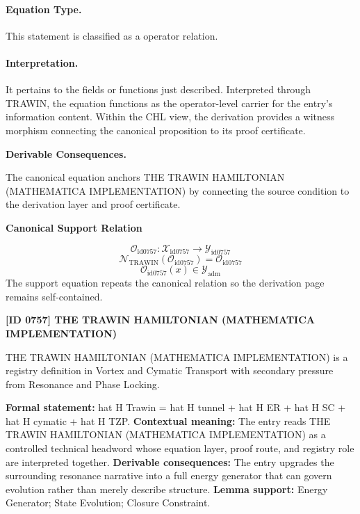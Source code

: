 \paragraph{Equation Type.}
This statement is classified as a operator relation.

\paragraph{Interpretation.}
It pertains to the fields or functions just described. Interpreted through TRAWIN, the equation functions as the operator-level carrier for the entry’s information content. Within the CHL view, the derivation provides a witness morphism connecting the canonical proposition to its proof certificate.

\par\vspace{0.35em}
\noindent\textbf{Derivable Consequences.}\quad
\begingroup
\footnotesize
\raggedright
The canonical equation anchors THE TRAWIN HAMILTONIAN (MATHEMATICA IMPLEMENTATION) by connecting the source condition to the derivation layer and proof certificate.
\par\endgroup

\noindent\textbf{Canonical Support Relation}\par
\[
\mathcal{O}_{\mathrm{id0757}}:\mathcal{X}_{\mathrm{id0757}}\longrightarrow\mathcal{Y}_{\mathrm{id0757}}
\]
\[
\mathcal{N}_{\mathrm{TRAWIN}}(\mathcal{O}_{\mathrm{id0757}})=\mathcal{O}_{\mathrm{id0757}}
\]
\[
\mathcal{O}_{\mathrm{id0757}}(x)\in\mathcal{Y}_{\mathrm{adm}}
\]
\noindent The support equation repeats the canonical relation so the derivation page remains self-contained.\par

\clearpage
\noindent\textbf{[ID 0757] THE TRAWIN HAMILTONIAN (MATHEMATICA IMPLEMENTATION)}\par
\vspace{0.35em}
\begingroup\small
{}
THE TRAWIN HAMILTONIAN (MATHEMATICA IMPLEMENTATION) is a registry definition in Vortex and Cymatic Transport with secondary pressure from Resonance and Phase Locking.

\begingroup\footnotesize\setlength{\emergencystretch}{3em}\sloppy
\textbf{Formal statement:} hat H Trawin = hat H tunnel + hat H ER + hat H SC + hat H cymatic + hat H TZP. \textbf{Contextual meaning:} The entry reads THE TRAWIN HAMILTONIAN (MATHEMATICA IMPLEMENTATION) as a controlled technical headword whose equation layer, proof route, and registry role are interpreted together. \textbf{Derivable consequences:} The entry upgrades the surrounding resonance narrative into a full energy generator that can govern evolution rather than merely describe structure. \textbf{Lemma support:} Energy Generator; State Evolution; Closure Constraint.\par
\endgroup

